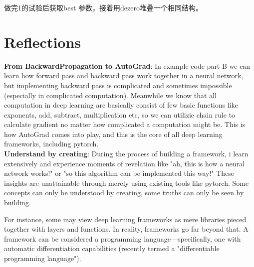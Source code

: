 \documentclass{article}
\newcommand{\secs}[1]{\section*{#1}}
\begin{document}
做完1的试验后获取best 参数，接着用dezero堆叠一个相同结构。



\secs{Reflections}
\noindent\textbf{From BackwardPropagation to AutoGrad}: In example code part-B we can learn how forward pass and backward pass work together in a neural network, but implementing backward pass is complicated and sometimes impossible (especially in complicated computation). Meanwhile we know that all computation in deep learning are basically consist of few basic functions like exponents, add, subtract, multiplication etc, so we can utilizie chain rule to calculate gradient no matter how complicated a computation might be. This is how AutoGrad comes into play, and this is the core of  all deep learning frameworks, including pytorch.\\

\noindent\textbf{Understand by creating}: During the process of building a framework, i learn extensively and experience moments of revelation like "ah, this is how a neural network works!" or "so this algorithm can be implemented this way!" These insights are unattainable through merely using existing tools like pytorch. Some concepts can only be understood by creating, some truths can only be seen by building. 

For instance, some may view deep learning frameworks as mere libraries pieced together with layers and functions. In reality, frameworks go far beyond that. A framework can be considered a programming language—specifically, one with automatic differentiation capabilities (recently termed a "differentiable programming language").
















\end{document}
